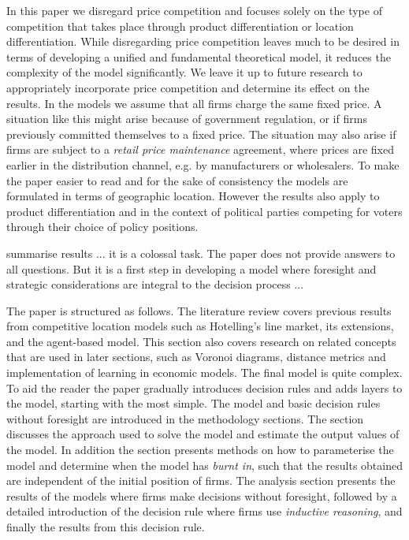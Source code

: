 \documentclass[preprint, 12pt]{elsarticle}
\newcommand*{\TODO}{\textbf{\fbox{??}}}%
\begin{document}
In this paper we disregard price competition and focuses solely on the type of competition that takes place through product differentiation or location differentiation. While disregarding price competition leaves much to be desired in terms of developing a unified and fundamental theoretical model, it reduces the complexity of the model significantly. We leave it up to future research to appropriately incorporate price competition and determine its effect on the results. In the models we assume that all firms charge the same fixed price. A situation like this might arise because of government regulation, or if firms previously committed themselves to a fixed price. The situation may also arise if firms are subject to a \emph{retail price maintenance} agreement, where prices are fixed earlier in the distribution channel, e.g. by manufacturers or wholesalers. To make the paper easier to read and for the sake of consistency the models are formulated in terms of geographic location. However the results also apply to product differentiation and in the context of political parties competing for voters through their choice of policy positions.

\TODO{summarise results ... it is a colossal task. The paper does not provide answers to all questions. But it is a first step in developing a model where foresight and strategic considerations are integral to the decision process ... }

The paper is structured as follows. The literature review covers previous results from competitive location models such as Hotelling's line market, its extensions, and the agent-based model. This section also covers research on related concepts that are used in later sections, such as Voronoi diagrams, distance metrics and implementation of learning in economic models. The final model is quite complex. To aid the reader the paper gradually introduces decision rules and adds layers to the model, starting with the most simple. The model and basic decision rules without foresight are introduced in the methodology sections. The section discusses the approach used to solve the model and estimate the output values of the model. In addition the section presents methods on how to parameterise the model and determine when the model has \emph{burnt in}, such that the results obtained are independent of the initial position of firms. The analysis section presents the results of the models where firms make decisions without foresight, followed by a detailed introduction of the decision rule where firms use \emph{inductive reasoning}, and finally the results from this decision rule.
\end{document}
